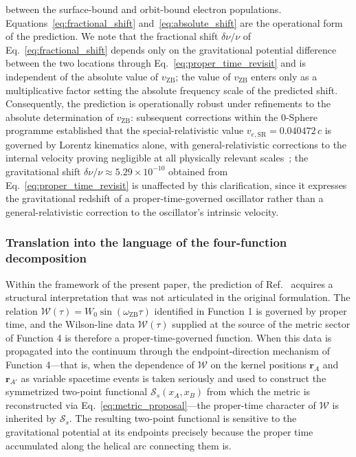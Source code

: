 \documentclass[%
 reprint, amsmath,amssymb, aps, prb, ]{revtex4-2}
\numberwithin{equation}{section}
\newcommand{\omZB}{\omega_{\text{ZB}}}
\newcommand{\WL}{\mathcal{W}}
\newcommand{\vZB}{v_{\mathrm{ZB}}}
\begin{document}
between the surface-bound and orbit-bound electron populations. Equations~\eqref{eq:fractional_shift} and~\eqref{eq:absolute_shift} are the operational form of the prediction. We note that the fractional shift $\delta\nu/\nu$ of Eq.~\eqref{eq:fractional_shift} depends only on the gravitational potential difference between the two locations through Eq.~\eqref{eq:proper_time_revisit} and is independent of the absolute value of $\vZB$; the value of $\vZB$ enters only as a multiplicative factor setting the absolute frequency scale of the predicted shift. Consequently, the prediction is operationally robust under refinements to the absolute determination of $\vZB$: subsequent corrections within the 0-Sphere programme established that the special-relativistic value $v_{e,\text{SR}} = 0.040472\,c$ is governed by Lorentz kinematics alone, with general-relativistic corrections to the internal velocity proving negligible at all physically relevant scales~\cite{hanamura28}; the gravitational shift $\delta\nu/\nu \approx 5.29 \times 10^{-10}$ obtained from Eq.~\eqref{eq:proper_time_revisit} is unaffected by this clarification, since it expresses the gravitational redshift of a proper-time-governed oscillator rather than a general-relativistic correction to the oscillator's intrinsic velocity.

\subsubsection{Translation into the language of the four-function decomposition}

Within the framework of the present paper, the prediction of Ref.~\cite{hanamura22} acquires a structural interpretation that was not articulated in the original formulation. The relation $\WL(\tau) = W_0 \sin(\omZB \tau)$ identified in Function 1 is governed by proper time, and the Wilson-line data $\WL(\tau)$ supplied at the source of the metric sector of Function 4 is therefore a proper-time-governed function. When this data is propagated into the continuum through the endpoint-direction mechanism of Function 4---that is, when the dependence of $\WL$ on the kernel positions $\mathbf{r}_A$ and $\mathbf{r}_{A'}$ as variable spacetime events is taken seriously and used to construct the symmetrized two-point functional $\mathcal{S}_s(x_A, x_B)$ from which the metric is reconstructed via Eq.~\eqref{eq:metric_proposal}---the proper-time character of $\WL$ is inherited by $\mathcal{S}_s$. The resulting two-point functional is sensitive to the gravitational potential at its endpoints precisely because the proper time accumulated along the helical arc connecting them is.
\end{document}
